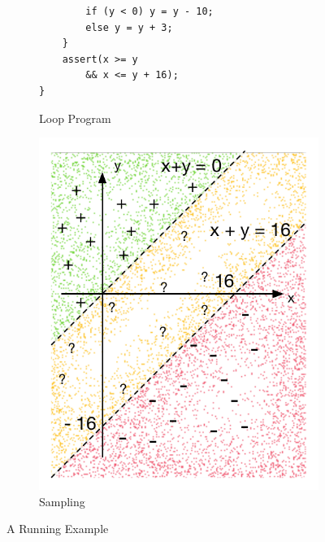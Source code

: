 \begin{figure}[t]
\begin{subfigure}{0.5\textwidth}
{\begin{verbatim}
        if (y < 0) y = y - 10;
        else y = y + 3;
    }
    assert(x >= y
        && x <= y + 16);
}
\end{verbatim}}
    \vspace{0.5cm}
    \caption{Loop Program}
    \label{fig:running:example:program}
\end{subfigure}%
\begin{subfigure}{.5\textwidth}
      \centering
      \includegraphics[scale=0.42]{figures/running-sampling.pdf}
      \caption{Sampling}
      \label{fig:running:example:sampling}
\end{subfigure}
\caption{A Running Example}
\label{fig:running:example}
\end{figure}

